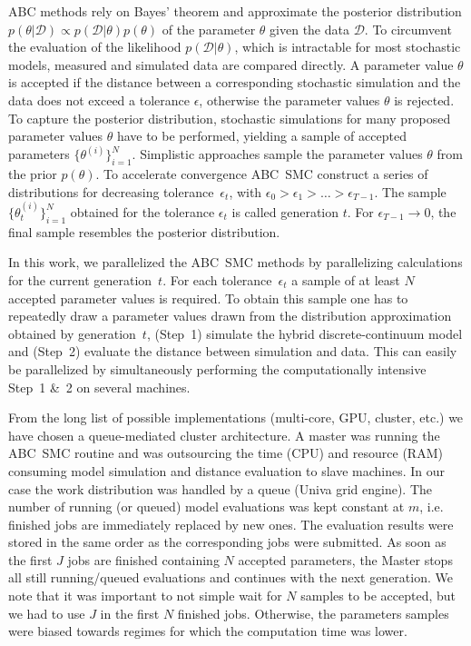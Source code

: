 \documentclass[10pt,letterpaper]{article}
\newcommand{\nj}[1]{{\color{blue}#1}}
\begin{document}
ABC methods rely on Bayes' theorem and approximate the posterior distribution $p(\theta|\mathcal{D}) \propto p(\mathcal{D}|\theta) p(\theta)$ of the parameter $\theta$ given the data $\mathcal{D}$. To circumvent the evaluation of the likelihood $p(\mathcal{D}|\theta)$, which is intractable for most stochastic models, measured and simulated data are compared directly. A parameter value $\theta$ is accepted if the distance between a corresponding stochastic simulation and the data does not exceed a tolerance $\epsilon$, otherwise the parameter values $\theta$ is rejected. To capture the posterior distribution, stochastic simulations for many proposed parameter values $\theta$ have to be performed, yielding a sample of accepted parameters $\{\theta^{(i)}\}_{i=1}^N$. Simplistic approaches sample the parameter values $\theta$ from the prior $p(\theta)$. To accelerate convergence ABC~SMC construct a series of distributions for decreasing tolerance~$\epsilon_t$, with $\epsilon_0 > \epsilon_1 > \ldots > \epsilon_{T-1}$. The sample $\{\theta_t^{(i)}\}_{i=1}^N$ obtained for the tolerance $\epsilon_t$ is called generation $t$. For $\epsilon_{T-1} \rightarrow 0$, the final sample resembles the posterior distribution.

In this work, we parallelized the ABC~SMC methods by parallelizing calculations for the current generation~$t$. For each tolerance~$\epsilon_t$ a sample of at least $N$ accepted parameter values is required. To obtain this sample one has to repeatedly draw a parameter values drawn from the distribution approximation obtained by generation~$t$, (Step~1) simulate the hybrid discrete-continuum model and (Step~2) evaluate the distance between simulation and data. This can easily be parallelized by simultaneously performing the computationally intensive Step~1 \&~2 on several machines.

From the long list of possible implementations (multi-core, GPU, cluster, etc.) we have chosen a queue-mediated cluster architecture. A master was running the ABC~SMC routine and was outsourcing the time (CPU) and resource (RAM) consuming model simulation and distance evaluation to slave machines. In our case the work distribution was handled by a queue (Univa grid engine). The number of running (or queued) model evaluations was kept constant at $m$, i.e. finished jobs are immediately replaced by new ones. The evaluation results were stored in the same order as the corresponding jobs were submitted. As soon as the first $J$ jobs are finished containing $N$ accepted parameters, the Master stops all still running/queued evaluations and continues with the next generation. We note that it was important to not simple wait for $N$ samples to be accepted, but we had to use $J$ in the first $N$ finished jobs. Otherwise, the parameters samples were biased towards regimes for which the computation time was lower. %
\end{document}
